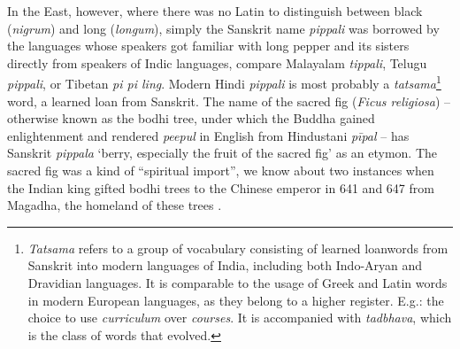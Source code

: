 In the East, however, where there was no Latin to distinguish between black (\textit{nigrum}) and long (\textit{longum}), simply the Sanskrit name \textit{pippali} was borrowed by the languages whose speakers got familiar with long pepper and its sisters directly from speakers of Indic languages, compare Malayalam \textit{tippali}, Telugu \textit{pippali}, or Tibetan \textit{pi pi ling}. Modern Hindi \textit{pippali} is most probably a \textit{tatsama}\footnote{\textit{Tatsama} refers to a group of vocabulary consisting of learned loanwords from Sanskrit into modern languages of India, including both Indo-Aryan and Dravidian languages. It is comparable to the usage of Greek and Latin words in modern European languages, as they belong to a higher register. E.g.: the choice to use \textit{curriculum} over \textit{courses}. It is accompanied with  \textit{tadbhava}, which is the class of words that evolved.} word, a learned loan from Sanskrit. The name of the sacred fig (\textit{Ficus religiosa}) -- otherwise known as the bodhi tree, under which the Buddha gained enlightenment and rendered \textit{peepul} in English from Hindustani \textit{p\={i}pal} -- has Sanskrit \textit{pippala} `berry, especially the fruit of the sacred fig' as an etymon. The sacred fig was a kind of ``spiritual import'', we know about two instances when the Indian king gifted bodhi trees to the Chinese emperor in 641 and 647 from Magadha, the homeland of these trees \parencite[122]{schafer_golden_1985}.

